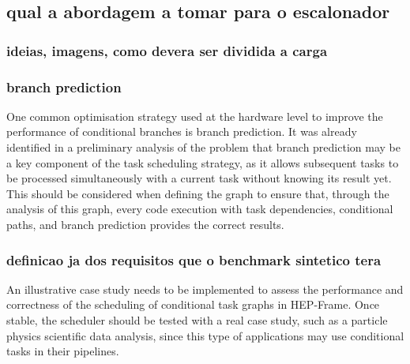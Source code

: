 \subsection{qual a abordagem a tomar para o escalonador}
\subsubsection{ideias, imagens, como devera ser dividida a carga}
\subsubsection{branch prediction}
One common optimisation strategy used at the hardware level to improve the performance of conditional branches is branch prediction. It was already identified in a preliminary analysis of the problem that branch prediction may be a key component of the task scheduling strategy, as it allows subsequent tasks to be processed simultaneously with a current task without knowing its result yet. This should be considered when defining the graph to ensure that, through the analysis of this graph, every code execution with task dependencies, conditional paths, and branch prediction provides the correct results.
\subsubsection{definicao ja dos requisitos que o benchmark sintetico tera}
An illustrative case study needs to be implemented to assess the performance and correctness of the scheduling of conditional task graphs in HEP-Frame. Once stable, the scheduler should be tested with a real case study, such as a particle physics scientific data analysis, since this type of applications may use conditional tasks in their pipelines. 